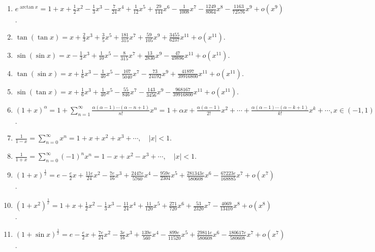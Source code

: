 \documentclass[../../main.tex]{subfiles}%
\begin{document}
\begin{enumerate}
\item $e^{\arctan x}=1+x+\frac{1}{2}x^2-\frac{1}{3}x^3-\frac{7}{24}x^4+\frac{1}{12}x^5+\frac{29}{144}x^6-\frac{1}{1008}x^7-\frac{1249}{8064}x^8-\frac{1163}{72576}x^9+o(x^9)$.
\\
\item $\tan(\tan x)=x+\frac{2}{3}x^3+\frac{3}{5}x^5+\frac{181}{315}x^7+\frac{59}{105}x^9+\frac{3455}{6237}x^{11}+o(x^{11})$.
\\
\item $\sin(\sin x)=x-\frac{1}{3}x^3+\frac{1}{10}x^5-\frac{8}{315}x^7+\frac{13}{2830}x^9-\frac{47}{49896}x^{11}+o(x^{11})$.
\\
\item $\tan(\sin x)=x+\frac{1}{6}x^3-\frac{1}{40}x^5-\frac{107}{5040}x^7-\frac{73}{24192}x^9+\frac{41897}{39916800}x^{11}+o(x^{11})$.
\\
\item $\sin(\tan x)=x+\frac{1}{6}x^3+\frac{1}{40}x^5-\frac{55}{846}x^7-\frac{143}{3456}x^9-\frac{968167}{39916800}x^{11}+o(x^{11})$.
\\
\item $(1+x)^\alpha=1+\sum_{n=1}^{\infty}\frac{\alpha(\alpha-1)\cdots(\alpha-n+1)}{n!}x^n=1+\alpha x+\frac{\alpha(\alpha-1)}{2!}x^2+\cdots+\frac{\alpha(\alpha-1)\cdots(\alpha-k+1)}{k!}x^k+\cdots,x\in(-1,1)$.
\\
\item $\frac{1}{1-x}=\sum_{n=0}^{\infty}x^n = 1+x+x^2+x^3+\cdots ,\quad |x|<1.$
\\
\item $\frac{1}{1+x}=\sum_{n=0}^{\infty}(-1)^n x^n = 1-x+x^2-x^3+\cdots ,\quad |x|<1.$
\\
\item $(1+x)^{\frac{1}{x}}=e-\frac{e}{2}x+\frac{11e}{24}x^2-\frac{7e}{16}x^3+\frac{2447e}{5760}x^4-\frac{959e}{2304}x^5+\frac{281343e}{580608}x^6-\frac{67223e}{168885}x^7+o(x^7)$.
\\
\item $(1+x^2)^{\frac{1}{x}}=1+x+\frac{1}{2}x^2-\frac{1}{3}x^3-\frac{11}{24}x^4+\frac{11}{120}x^5+\frac{271}{720}x^6+\frac{53}{2320}x^7-\frac{4069}{13410}x^8+o(x^8)$.
\\
\item $(1+\sin x)^{\frac{1}{x}}=e-\frac{e}{2}x+\frac{7e}{24}x^2-\frac{3e}{16}x^3+\frac{139e}{560}x^4-\frac{899e}{11520}x^5+\frac{29811e}{580608}x^6-\frac{180617e}{580608}x^7+o(x^7)$.
\end{enumerate}
\end{document}
